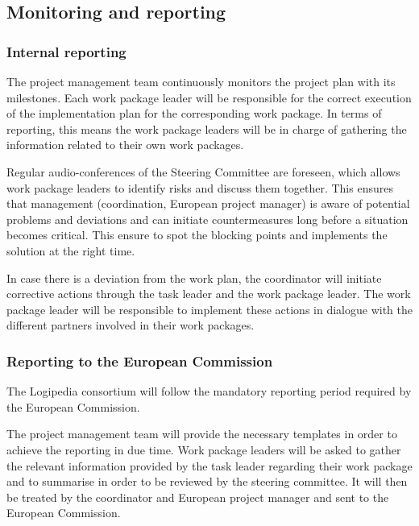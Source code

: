 \subsection*{Monitoring and reporting}

\subsubsection*{Internal reporting}

The project management team continuously monitors the project plan
with its milestones. Each work package leader will be
responsible for the correct execution of the implementation plan for
the corresponding work package. In terms of reporting, this means the work package leaders
will be in charge of gathering the information related to their own
work packages.

Regular audio-conferences of the Steering Committee are foreseen,
which allows work package leaders to identify risks and
discuss them together. This ensures that management (coordination,
European project manager) is aware of potential problems and
deviations and can initiate countermeasures long before a situation
becomes critical. This ensure to spot the blocking points and implements
the solution at the right time.


In case there is a deviation from the work plan, the 
coordinator will initiate corrective actions through the
task leader and the work package leader. The work package leader will
be responsible to implement these actions in dialogue with the
different partners involved in their work packages.

\subsubsection*{Reporting to the European Commission}

The Logipedia consortium will follow the mandatory reporting period
required by the European Commission. 

The project management team will provide the necessary templates in
order to achieve the reporting in due time. Work package leaders will
be asked to gather the relevant information provided by the task
leader regarding their work package and to summarise in order to be
reviewed by the steering committee. It will then be treated by the
coordinator and European project manager and sent to the
European Commission.

